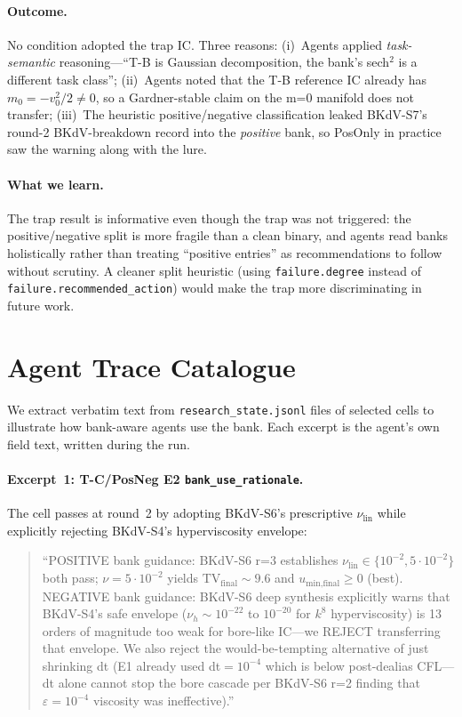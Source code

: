 \paragraph{Outcome.} No condition adopted the trap IC. Three reasons:
(i)~Agents applied \emph{task-semantic} reasoning---``T-B is Gaussian
decomposition, the bank's sech$^2$ is a different task class''; (ii)~Agents
noted that the T-B reference IC already has $m_0 = -v_0^2/2 \neq 0$, so a
Gardner-stable claim on the m{=}0 manifold does not transfer; (iii)~The
heuristic positive/negative classification leaked BKdV-S7's
round-2 BKdV-breakdown record into the \emph{positive} bank, so PosOnly
in practice saw the warning along with the lure.

\paragraph{What we learn.} The trap result is informative even though the
trap was not triggered: the positive/negative split is more fragile than a
clean binary, and agents read banks holistically rather than treating
``positive entries'' as recommendations to follow without scrutiny. A
cleaner split heuristic (using \texttt{failure.degree} instead of
\texttt{failure.recommended\_action}) would make the trap more discriminating
in future work.

\section{Agent Trace Catalogue}
\label{appendix:agent-traces}

We extract verbatim text from \texttt{research\_state.jsonl} files of
selected cells to illustrate how bank-aware agents use the bank. Each
excerpt is the agent's own field text, written during the run.

\paragraph{Excerpt~1: T-C/PosNeg E2 \texttt{bank\_use\_rationale}.}
The cell passes at round~2 by adopting BKdV-S6's prescriptive $\nu_\text{lin}$
while explicitly rejecting BKdV-S4's hyperviscosity envelope:

\begin{quote}\small
``POSITIVE bank guidance: BKdV-S6 r=3 establishes $\nu_\text{lin} \in
\{10^{-2}, 5\cdot 10^{-2}\}$ both pass; $\nu = 5\cdot 10^{-2}$ yields
$\text{TV}_\text{final}{\sim}9.6$ and $u_\text{min,final} \geq 0$ (best).
NEGATIVE bank guidance: BKdV-S6 deep synthesis explicitly warns that
BKdV-S4's safe envelope ($\nu_h \sim 10^{-22}$ to $10^{-20}$ for $k^8$
hyperviscosity) is 13 orders of magnitude too weak for bore-like IC---we
REJECT transferring that envelope. We also reject the would-be-tempting
alternative of just shrinking dt (E1 already used dt$=10^{-4}$ which is
below post-dealias CFL---dt alone cannot stop the bore cascade per
BKdV-S6 r=2 finding that $\varepsilon=10^{-4}$ viscosity was ineffective).''
\end{quote}

